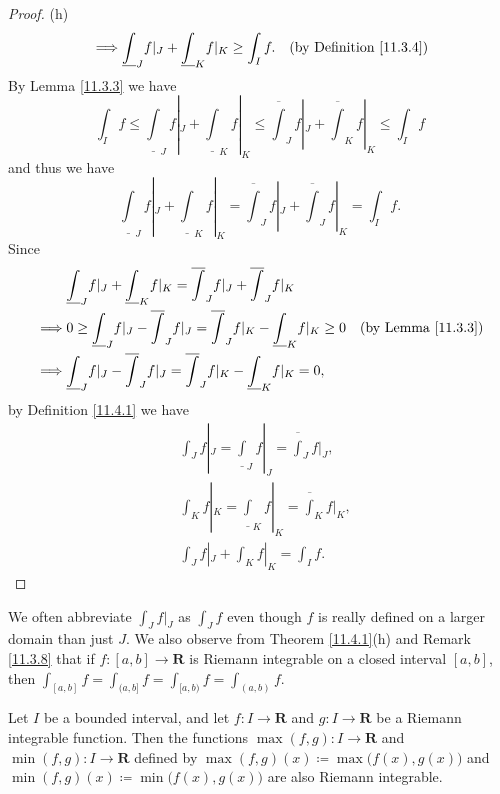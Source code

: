 \begin{proof}{(h)}
\begin{align*}
        \implies & \underline{\int}_J f|_J + \underline{\int}_K f|_K \geq \int_I f.                               & \text{(by Definition \ref{11.3.4})}
    \end{align*}
    By Lemma \ref{11.3.3} we have
    \[
        \int_I f \leq \underline{\int}_J f|_J + \underline{\int}_K f|_K \leq \overline{\int}_J f|_J + \overline{\int}_K f|_K \leq \int_I f
    \]
    and thus we have
    \[
        \underline{\int}_J f|_J + \underline{\int}_K f|_K = \overline{\int}_J f|_J + \overline{\int}_J f|_K = \int_I f.
    \]
    Since
    \begin{align*}
                 & \underline{\int}_J f|_J + \underline{\int}_K f|_K = \overline{\int}_J f|_J + \overline{\int}_J f|_K                                                \\
        \implies & 0 \geq \underline{\int}_J f|_J - \overline{\int}_J f|_J = \overline{\int}_J f|_K - \underline{\int}_K f|_K \geq 0 & \text{(by Lemma \ref{11.3.3})} \\
        \implies & \underline{\int}_J f|_J - \overline{\int}_J f|_J = \overline{\int}_J f|_K - \underline{\int}_K f|_K = 0,
    \end{align*}
    by Definition \ref{11.4.1} we have
    \begin{align*}
         & \int_J f|_J = \underline{\int}_J f|_J = \overline{\int}_J f|_J, \\
         & \int_K f|_K = \underline{\int}_K f|_K = \overline{\int}_K f|_K, \\
         & \int_J f|_J + \int_K f|_K = \int_I f.
    \end{align*}
\end{proof}

\begin{remark}\label{11.4.2}
    We often abbreviate \(\int_J f|_J\) as \(\int_J f\) even though \(f\) is really defined on a larger domain than just \(J\).
    We also observe from Theorem \ref{11.4.1}(h) and Remark \ref{11.3.8} that if \(f : [a, b] \to \mathbf{R}\) is Riemann integrable on a closed interval \([a, b]\), then \(\int_{[a, b]} f = \int_{(a, b]} f = \int_{[a, b)} f = \int_{(a, b)} f\).
\end{remark}

\begin{theorem}\label{11.4.3}
    Let \(I\) be a bounded interval, and let \(f : I \to \mathbf{R}\) and \(g : I \to \mathbf{R}\) be a Riemann integrable function.
    Then the functions \(\max(f, g) : I \to \mathbf{R}\) and \(\min(f, g) : I \to \mathbf{R}\) defined by \(\max(f, g)(x) \coloneqq \max\big(f(x), g(x)\big)\) and \(\min(f, g)(x) \coloneqq \min\big(f(x), g(x)\big)\) are also Riemann integrable.
\end{theorem}

